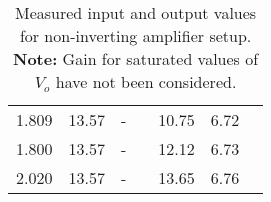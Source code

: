 \begin{table}[H]
\begin{tabular}{|c|ccc|ccc|}
    1.809                  & \multicolumn{1}{c|}{13.57} & \multicolumn{1}{c|}{-} &                    & \multicolumn{1}{c|}{10.75} & \multicolumn{1}{c|}{6.72} &                    \\ \cline{1-3} \cline{5-6}
    1.800                  & \multicolumn{1}{c|}{13.57} & \multicolumn{1}{c|}{-} &                    & \multicolumn{1}{c|}{12.12} & \multicolumn{1}{c|}{6.73} &                    \\ \cline{1-3} \cline{5-6}
    2.020                  & \multicolumn{1}{c|}{13.57} & \multicolumn{1}{c|}{-} &                    & \multicolumn{1}{c|}{13.65} & \multicolumn{1}{c|}{6.76} &                    \\ \hline
    \end{tabular}
    \caption{Measured input and output values for non-inverting amplifier setup.\\\textbf{Note: } Gain for saturated values of $V_o$ have not been considered.}
    \label{tab:2}
    \end{table}